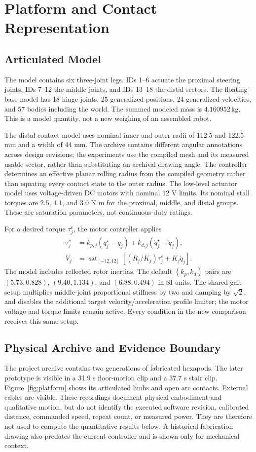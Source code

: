 \documentclass[letterpaper,10pt,conference]{ieeeconf}
\begin{document}
\section{Platform and Contact Representation}
\subsection{Articulated Model}
The model contains six three-joint legs. IDs 1--6 actuate the proximal steering joints, IDs 7--12 the middle joints, and IDs 13--18 the distal sectors. The floating-base model has 18 hinge joints, 25 generalized positions, 24 generalized velocities, and 57 bodies including the world. The summed modeled mass is $4.160952\,\mathrm{kg}$. This is a model quantity, not a new weighing of an assembled robot.

The distal contact model uses nominal inner and outer radii of 112.5 and 122.5 mm and a width of 44 mm. The archive contains different angular annotations across design revisions; the experiments use the compiled mesh and its measured usable sector, rather than substituting an archival drawing angle. The controller determines an effective planar rolling radius from the compiled geometry rather than equating every contact state to the outer radius. The low-level actuator model uses voltage-driven DC motors with nominal 12 V limits. Its nominal stall torques are 2.5, 4.1, and 3.0 N m for the proximal, middle, and distal groups. These are saturation parameters, not continuous-duty ratings.

For a desired torque $\tau_j^c$, the motor controller applies
\begin{align}
 \tau_j^c &= k_{p,j}(q_j^\star-q_j)+k_{d,j}(\dot q_j^\star-\dot q_j),\\
 V_j &= \operatorname{sat}_{[-12,12]}\left[(R_j/K_j)\tau_j^c+K_j\dot q_j\right].
\end{align}
The model includes reflected rotor inertias. The default $(k_p,k_d)$ pairs are $(5.73,0.828)$, $(9.40,1.134)$, and $(6.88,0.494)$ in SI units. The shared gait setup multiplies middle-joint proportional stiffness by two and damping by $\sqrt{2}$, and disables the additional target velocity/acceleration profile limiter; the motor voltage and torque limits remain active. Every condition in the new comparison receives this same setup.

\subsection{Physical Archive and Evidence Boundary}
The project archive contains two generations of fabricated hexapods. The later prototype is visible in a 31.9 s floor-motion clip and a 37.7 s stair clip. Figure~\ref{fig:platform} shows its articulated limbs and open arc contacts. External cables are visible. These recordings document physical embodiment and qualitative motion, but do not identify the executed software revision, calibrated distance, commanded speed, repeat count, or measured power. They are therefore not used to compute the quantitative results below. A historical fabrication drawing also predates the current controller and is shown only for mechanical context.
\end{document}
